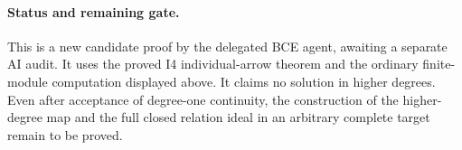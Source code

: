 \paragraph{Status and remaining gate.}
This is a new candidate proof by the delegated BCE agent, awaiting a
separate AI audit. It uses the proved I4 individual-arrow theorem and
the ordinary finite-module computation displayed above. It claims no
solution in higher degrees. Even after acceptance of degree-one
continuity, the construction of the higher-degree map and the full
closed relation ideal in an arbitrary complete target remain to be
proved.
